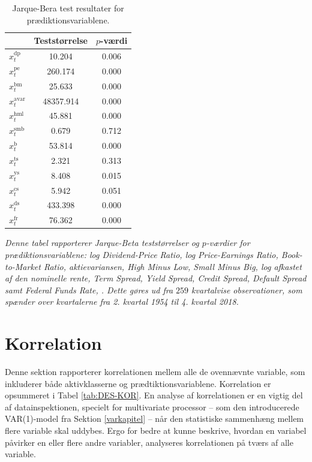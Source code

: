 \documentclass[
  a4paper,
  oneside]{memoir}
\begin{document}
\begin{table}[H]

\caption{\label{tab:JB-TILSTANDSVARIABLE}Jarque-Bera test resultater for prædiktionsvariablene.}
\centering
\begin{threeparttable}
\begin{tabular}[t]{lcc}
\toprule
  & Teststørrelse & $p$-værdi\\
\midrule
\rowcolor{gray!6}  $x_t^{\text{dp}}$ & 10.204 & 0.006\\
$x_t^{\text{pe}}$ & 260.174 & 0.000\\
\rowcolor{gray!6}  $x_t^{\text{bm}}$ & 25.633 & 0.000\\
$x_t^{\text{avar}}$ & 48357.914 & 0.000\\
\rowcolor{gray!6}  $x_t^{\text{hml}}$ & 45.881 & 0.000\\
$x_t^{\text{smb}}$ & 0.679 & 0.712\\
\rowcolor{gray!6}  $x_t^{\text{b}}$ & 53.814 & 0.000\\
$x_t^{\text{ts}}$ & 2.321 & 0.313\\
\rowcolor{gray!6}  $x_t^{\text{ys}}$ & 8.408 & 0.015\\
$x_t^{\text{cs}}$ & 5.942 & 0.051\\
\rowcolor{gray!6}  $x_t^{\text{ds}}$ & 433.398 & 0.000\\
$x_t^{\text{fr}}$ & 76.362 & 0.000\\
\bottomrule
\end{tabular}
\begin{tablenotes}
\item \textit{Denne tabel rapporterer Jarque-Beta teststørrelser og $p$-værdier for prædiktionsvariablene: log Dividend-Price Ratio, log Price-Earnings Ratio, Book-to-Market Ratio, aktievariansen, High Minus Low, Small Minus Big, log afkastet af den nominelle rente, Term Spread, Yield Spread, Credit Spread, Default Spread samt Federal Funds Rate, \citep{Jarque1980}. Dette gøres ud fra $259$ kvartalvise observationer, som spænder over kvartalerne fra 2. kvartal 1954 til 4. kvartal 2018.}
\end{tablenotes}
\end{threeparttable}
\end{table}

\hypertarget{korr}{%
\section{Korrelation}\label{korr}}

Denne sektion rapporterer korrelationen mellem alle de ovennævnte variable, som inkluderer både aktivklasserne og prædtiktionsvariablene. Korrelation er opsummeret i Tabel \ref{tab:DES-KOR}. En analyse af korrelationen er en vigtig del af datainspektionen, specielt for multivariate processor -- som den introducerede VAR(1)-model fra Sektion \ref{varkapitel} -- når den statistiske sammenhæng mellem flere variable skal uddybes. Ergo for bedre at kunne beskrive, hvordan en variabel påvirker en eller flere andre variabler, analyseres korrelationen på tværs af alle variable.
\end{document}
